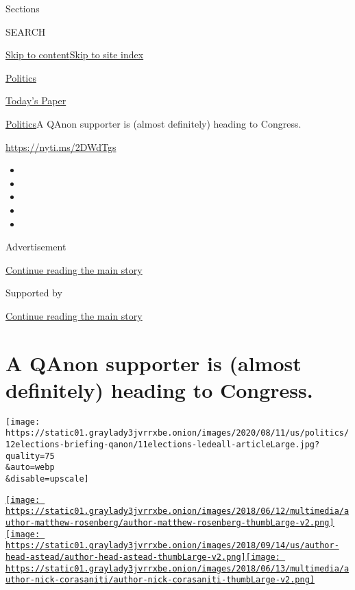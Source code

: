 Sections

SEARCH

\protect\hyperlink{site-content}{Skip to
content}\protect\hyperlink{site-index}{Skip to site index}

\href{https://www.nytimes3xbfgragh.onion/section/politics}{Politics}

\href{https://myaccount.nytimes3xbfgragh.onion/auth/login?response_type=cookie\&client_id=vi}{}

\href{https://www.nytimes3xbfgragh.onion/section/todayspaper}{Today's
Paper}

\href{/section/politics}{Politics}\textbar{}A QAnon supporter is (almost
definitely) heading to Congress.

\url{https://nyti.ms/2DWdTgs}

\begin{itemize}
\item
\item
\item
\item
\item
\end{itemize}

Advertisement

\protect\hyperlink{after-top}{Continue reading the main story}

Supported by

\protect\hyperlink{after-sponsor}{Continue reading the main story}

\hypertarget{a-qanon-supporter-is-almost-definitely-heading-to-congress}{%
\section{A QAnon supporter is (almost definitely) heading to
Congress.}\label{a-qanon-supporter-is-almost-definitely-heading-to-congress}}

\texttt{[image: https://static01.graylady3jvrrxbe.onion/images/2020/08/11/us/politics/12elections-briefing-qanon/11elections-ledeall-articleLarge.jpg?quality=75\\\&auto=webp\\\&disable=upscale]}

\href{https://www.nytimes3xbfgragh.onion/by/matthew-rosenberg}{\texttt{[image: https://static01.graylady3jvrrxbe.onion/images/2018/06/12/multimedia/author-matthew-rosenberg/author-matthew-rosenberg-thumbLarge-v2.png]}}\href{https://www.nytimes3xbfgragh.onion/by/astead-w-herndon}{\texttt{[image: https://static01.graylady3jvrrxbe.onion/images/2018/09/14/us/author-head-astead/author-head-astead-thumbLarge-v2.png]}}\href{https://www.nytimes3xbfgragh.onion/by/nick-corasaniti}{\texttt{[image: https://static01.graylady3jvrrxbe.onion/images/2018/06/13/multimedia/author-nick-corasaniti/author-nick-corasaniti-thumbLarge-v2.png]}}


